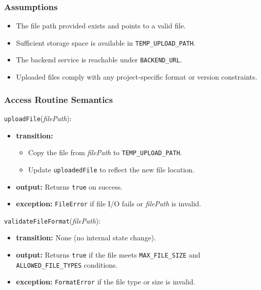 \documentclass[12pt, titlepage]{article}
\begin{document}
\subsubsection{Assumptions}

\begin{itemize}
    \item The file path provided exists and points to a valid file.
    \item Sufficient storage space is available in \texttt{TEMP\_UPLOAD\_PATH}.
    \item The backend service is reachable under \texttt{BACKEND\_URL}.
    \item Uploaded files comply with any project-specific format or version constraints.
\end{itemize}

\subsubsection{Access Routine Semantics}

\noindent \texttt{uploadFile}(\textit{filePath}):
\begin{itemize}
    \item \textbf{transition:} 
    \begin{itemize}
        \item Copy the file from \textit{filePath} to \texttt{TEMP\_UPLOAD\_PATH}.
        \item Update \texttt{uploadedFile} to reflect the new file location.
    \end{itemize}
    \item \textbf{output:} Returns \texttt{true} on success.
    \item \textbf{exception:} \texttt{FileError} if file I/O fails or \textit{filePath} is invalid.
\end{itemize}

\noindent \texttt{validateFileFormat}(\textit{filePath}):
\begin{itemize}
    \item \textbf{transition:} None (no internal state change).
    \item \textbf{output:} Returns \texttt{true} if the file meets \texttt{MAX\_FILE\_SIZE} and 
    \texttt{ALLOWED\_FILE\_TYPES} conditions.
    \item \textbf{exception:} \texttt{FormatError} if the file type or size is invalid.
\end{itemize}
\end{document}
